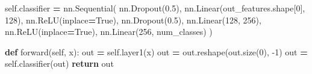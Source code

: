 \documentclass[10pt,a4paper]{article}
\newenvironment{Shaded}{\begin{snugshade}}{\end{snugshade}}
\newcommand{\ControlFlowTok}[1]{\textcolor[rgb]{0.13,0.29,0.53}{\textbf{#1}}}
\newcommand{\DecValTok}[1]{\textcolor[rgb]{0.00,0.00,0.81}{#1}}
\newcommand{\FloatTok}[1]{\textcolor[rgb]{0.00,0.00,0.81}{#1}}
\newcommand{\KeywordTok}[1]{\textcolor[rgb]{0.13,0.29,0.53}{\textbf{#1}}}
\newcommand{\NormalTok}[1]{#1}
\newcommand{\OperatorTok}[1]{\textcolor[rgb]{0.81,0.36,0.00}{\textbf{#1}}}
\newcommand{\VariableTok}[1]{\textcolor[rgb]{0.00,0.00,0.00}{#1}}
\theoremstyle{break}
\begin{document}
\begin{Shaded}
\begin{Highlighting}[]
        \VariableTok{self}\NormalTok{.classifier }\OperatorTok{=}\NormalTok{ nn.Sequential(}
\NormalTok{            nn.Dropout(}\FloatTok{0.5}\NormalTok{),}
\NormalTok{            nn.Linear(out_features.shape[}\DecValTok{0}\NormalTok{], }\DecValTok{128}\NormalTok{),}
\NormalTok{            nn.ReLU(inplace}\OperatorTok{=}\VariableTok{True}\NormalTok{),}
\NormalTok{            nn.Dropout(}\FloatTok{0.5}\NormalTok{),}
\NormalTok{            nn.Linear(}\DecValTok{128}\NormalTok{, }\DecValTok{256}\NormalTok{),}
\NormalTok{            nn.ReLU(inplace}\OperatorTok{=}\VariableTok{True}\NormalTok{),}
\NormalTok{            nn.Linear(}\DecValTok{256}\NormalTok{, num_classes)}
\NormalTok{        )}
        
    \KeywordTok{def}\NormalTok{ forward(}\VariableTok{self}\NormalTok{, x):}
\NormalTok{        out }\OperatorTok{=} \VariableTok{self}\NormalTok{.layer1(x)}
\NormalTok{        out }\OperatorTok{=}\NormalTok{ out.reshape(out.size(}\DecValTok{0}\NormalTok{), }\DecValTok{-1}\NormalTok{)}
\NormalTok{        out }\OperatorTok{=} \VariableTok{self}\NormalTok{.classifier(out)}
        \ControlFlowTok{return}\NormalTok{ out}
    
    
\end{Highlighting}
\end{Shaded}
\end{document}
